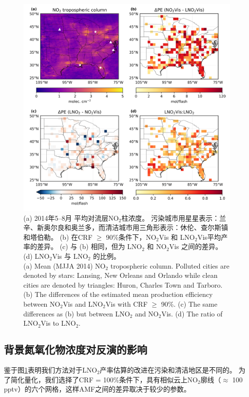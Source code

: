 \begin{figure}[t]
\centering
\includegraphics[width=13cm]{./figures/delta.png}
\caption{(a) 2014年5--8月  平均对流层NO$_\textrm{2}$柱浓度。
污染城市用星星表示：兰辛、新奥尔良和奥兰多，而清洁城市用三角形表示：休伦、查尔斯镇和塔伯勒。
(b) 在CRF $\geq$ 90\%条件下，NO$_\textrm{2}$Vis 和 LNO$_\textrm{2}$Vis平均产率的差异。
(c) 与 (b) 相同，但为 LNO$_\textrm{2}$ 和 NO$_\textrm{2}$Vis 之间的差异。
(d) LNO$_\textrm{2}$Vis 与 LNO$_\textrm{2}$ 的比例。\\
(a) Mean (MJJA 2014) NO$_\textrm{2}$ tropospheric column.
Polluted cities are denoted by stars: Lansing, New Orleans and Orlando while clean cities are denoted by triangles: Huron, Charles Town and Tarboro.
(b) The differences of the estimated mean production efficiency between NO$_\textrm{2}$Vis and LNO$_\textrm{2}$Vis with CRF $\geq$ 90\%.
(c) The same differences as (b) but between LNO$_\textrm{2}$ and NO$_\textrm{2}$Vis.
(d) The ratio of LNO$_\textrm{2}$Vis to LNO$_\textrm{2}$.
}
\label{fig:delta}
\end{figure}

\subsection{背景氮氧化物浓度对反演的影响}

鉴于图\ref{fig:delta}表明我们方法对于LNO$_2$产率估算的改进在污染和清洁地区是不同的。
为了简化量化，我们选择了CRF = 100\%条件下，具有相似云上NO$_2$廓线（$\approx$ 100 pptv）的六个网格，这样AMF之间的差异取决于较少的参数。

